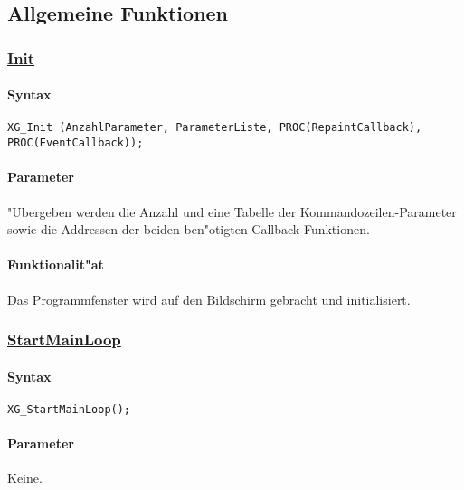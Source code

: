 \subsection{Allgemeine Funktionen\label{XG}}


\subsubsection{\underline{Init}}

\paragraph{Syntax}

\begin{verbatim}
XG_Init (AnzahlParameter, ParameterListe, PROC(RepaintCallback), PROC(EventCallback));
\end{verbatim}

\paragraph{Parameter}
%
%
"Ubergeben werden die Anzahl und eine Tabelle der Kommandozeilen-Parameter
sowie die Addressen der beiden ben"otigten Callback-Funktionen.


\paragraph{Funktionalit"at}
Das Programmfenster wird auf den Bildschirm gebracht und initialisiert.


\subsubsection{\underline{StartMainLoop}}


\paragraph{Syntax}

\begin{verbatim}
XG_StartMainLoop();
\end{verbatim}

\paragraph{Parameter}
Keine.

